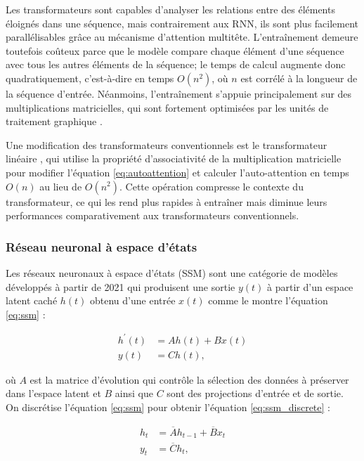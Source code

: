 Les transformateurs sont capables d'analyser les relations entre des éléments éloignés dans une
séquence, mais contrairement aux RNN, ils sont plus facilement parallélisables grâce au mécanisme
d'attention multitête. L'entraînement demeure toutefois coûteux parce que le modèle compare chaque
élément d'une séquence avec tous les autres éléments de la séquence; le temps de calcul augmente
donc quadratiquement, c'est-à-dire en temps $O(n^2)$, où $n$ est corrélé à la longueur de la
séquence d'entrée. Néanmoins, l'entraînement s'appuie principalement sur des multiplications
matricielles, qui sont fortement optimisées par les unités de traitement graphique \cite{gu2024}.

Une modification des transformateurs conventionnels est le transformateur linéaire
\cite{katharopoulos2020}, qui utilise la propriété d'associativité de la multiplication
matricielle pour modifier l'équation \ref{eq:autoattention} et calculer l'auto-attention en temps
$O(n)$ au lieu de $O(n^2)$. Cette opération compresse le contexte du transformateur, ce qui les
rend plus rapides à entraîner mais diminue leurs performances comparativement aux transformateurs
conventionnels.

\subsubsection{Réseau neuronal à espace d'états}
Les réseaux neuronaux à espace d'états (SSM) sont une catégorie de modèles développés à partir de
2021 qui produisent une sortie $y(t)$ à partir d'un espace latent caché $h(t)$ obtenu d'une entrée
$x(t)$ \cite{gu2024} comme le montre l'équation \ref{eq:ssm} :

\begin{equation}
    \label{eq:ssm}
    \begin{split}
        h^\prime (t) &= Ah(t) + Bx(t) \\
        y(t) &= Ch(t),
    \end{split}
\end{equation}

où $A$ est la matrice d'évolution qui contrôle la sélection des données à préserver dans l'espace
latent et $B$ ainsi que $C$ sont des projections d'entrée et de sortie. On discrétise l'équation
\ref{eq:ssm} pour obtenir l'équation \ref{eq:ssm_discrete} :

\begin{equation}
    \label{eq:ssm_discrete}
    \begin{split}
        h_t &= \overline{A} h_{t-1} + \overline{B} x_t \\
        y_t &= \overline{C} h_t,
    \end{split}
\end{equation}


